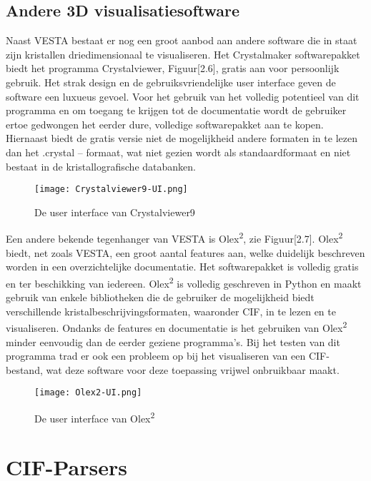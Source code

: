 \subsection{Andere 3D visualisatiesoftware}
Naast VESTA bestaat er nog een groot aanbod aan andere software die in staat zijn kristallen driedimensionaal te visualiseren. Het Crystalmaker softwarepakket biedt het programma Crystalviewer, Figuur[2.6], gratis aan voor persoonlijk gebruik. Het strak design en de gebruiksvriendelijke user interface geven de software een luxueus gevoel. Voor het gebruik van het volledig potentieel van dit programma en om toegang te krijgen tot de documentatie wordt de gebruiker ertoe gedwongen het eerder dure, volledige softwarepakket aan te kopen. Hiernaast biedt de gratis versie niet de mogelijkheid andere formaten in te lezen dan het .crystal – formaat, wat niet gezien wordt als standaardformaat en niet bestaat in de kristallografische databanken. 

\begin{figure}[h]
\texttt{[image: Crystalviewer9-UI.png]}
\caption{De user interface van Crystalviewer9}
\end{figure}

\par
Een andere bekende tegenhanger van VESTA is Olex\textsuperscript{2}, zie Figuur[2.7]. Olex\textsuperscript{2} biedt, net zoals VESTA, een groot aantal features aan, welke duidelijk beschreven worden in een overzichtelijke documentatie. Het softwarepakket is volledig gratis en ter beschikking van iedereen. Olex\textsuperscript{2} is volledig geschreven in Python en maakt gebruik van enkele bibliotheken die de gebruiker de mogelijkheid biedt verschillende kristalbeschrijvingsformaten, waaronder CIF, in te lezen en te visualiseren. Ondanks de features en documentatie is het gebruiken van Olex\textsuperscript{2} minder eenvoudig dan de eerder geziene programma’s. Bij het testen van dit programma trad er ook een probleem op bij het visualiseren van een CIF-bestand, wat deze software voor deze toepassing vrijwel onbruikbaar maakt.

\begin{figure}[h]
\texttt{[image: Olex2-UI.png]}
\caption{De user interface van Olex\textsuperscript{2}}
\end{figure}

\section{CIF-Parsers}
